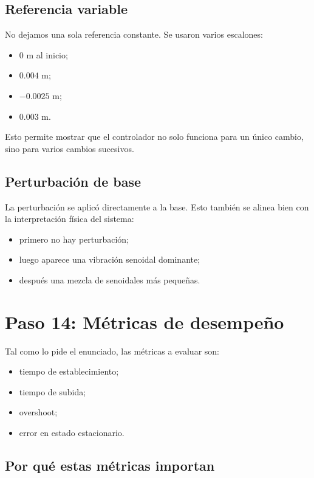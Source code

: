 \documentclass[11pt]{article}
\begin{document}
\subsection{Referencia variable}

No dejamos una sola referencia constante. Se usaron varios escalones:

\begin{itemize}[leftmargin=1.2cm]
\item $0$ m al inicio;
\item $0.004$ m;
\item $-0.0025$ m;
\item $0.003$ m.
\end{itemize}

Esto permite mostrar que el controlador no solo funciona para un \'unico cambio, sino para varios cambios sucesivos.

\subsection{Perturbaci\'on de base}

La perturbaci\'on se aplic\'o directamente a la base. Esto tambi\'en se alinea bien con la interpretaci\'on f\'isica del sistema:

\begin{itemize}[leftmargin=1.2cm]
\item primero no hay perturbaci\'on;
\item luego aparece una vibraci\'on senoidal dominante;
\item despu\'es una mezcla de senoidales m\'as peque\~nas.
\end{itemize}

\section{Paso 14: M\'etricas de desempe\~no}

Tal como lo pide el enunciado, las m\'etricas a evaluar son:

\begin{itemize}[leftmargin=1.2cm]
\item tiempo de establecimiento;
\item tiempo de subida;
\item overshoot;
\item error en estado estacionario.
\end{itemize}

\subsection{Por qu\'e estas m\'etricas importan}
\end{document}
